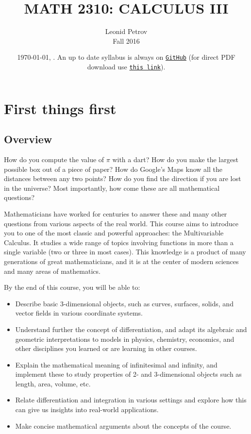 \documentclass[oneside,11pt]{amsart}
\begin{document}
\title[MATH 2310: CALCULUS III]{MATH 2310: CALCULUS III}
\author{Leonid Petrov\\Fall 2016}
\date{\today, \currenttime. An up to date syllabus is always on \href{https://github.com/lenis2000/Syllabi/blob/master/Syllabus_2310_f16.pdf}{\texttt{GitHub}} (for direct PDF download use \href{https://github.com/lenis2000/Syllabi/raw/master/Syllabus_2310_f16.pdf}{\texttt{this link}}).}
\maketitle

\setcounter{tocdepth}{3}

\section{First things first}

\subsection{Overview}

How do you compute the value of $\pi$ with a dart? How do you make the largest possible box out of a piece of paper? How do Google's Maps know all the distances between any two points? How do you find the direction if you are lost in the universe? Most importantly, how come these are all mathematical questions?

Mathematicians have worked for centuries to answer these and many other questions from various aspects of the real world. This course aims to introduce you to one of the most classic and powerful approaches: the Multivariable Calculus. It studies a wide range of topics involving functions in more than a single variable (two or three in most cases). This knowledge is a product of many generations of great mathematicians, and it is at the center of modern sciences and many areas of mathematics. 

By the end of this course, you will be able to:
\begin{itemize}
	\item 
	Describe basic 3-dimensional objects, such as curves, surfaces, solids, and vector fields in various coordinate systems.
	\item 
	Understand further the concept of differentiation, and adapt its algebraic and geometric interpretations to models in physics, chemistry, economics, and other disciplines you learned or are learning in other courses.
	\item 
	Explain the mathematical meaning of infinitesimal and infinity, and implement these to study properties of 2- and 3-dimensional objects such as length, area, volume, etc.
	\item 
	Relate differentiation and integration in various settings and explore how this can give us insights into real-world applications.
	\item 
	Make concise mathematical arguments about the concepts of the course.
\end{itemize}
\end{document}
